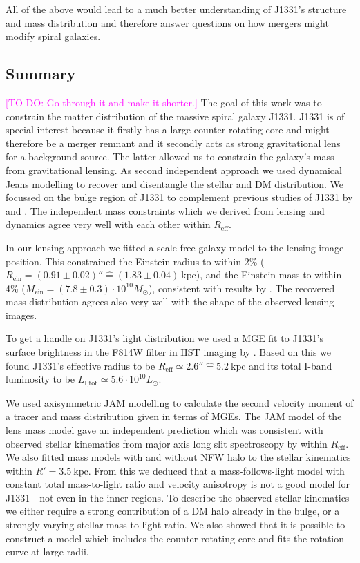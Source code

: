 \documentclass[useAMS,usenatbib]{mnras}
\newcommand{\Wilma}[1]{\textcolor{Magenta}{#1}}
\begin{document}
All of the above would lead to a much better understanding of J1331's structure and mass distribution and therefore answer questions on how mergers might modify spiral galaxies.

\subsection{Summary}
\Wilma{[TO DO: Go through it and make it shorter.]}
The goal of this work was to constrain the matter distribution of the massive spiral galaxy J1331. J1331 is of special interest because it firstly has a large counter-rotating core and might therefore be a merger remnant and it secondly acts as strong gravitational lens for a background source. The latter allowed us to constrain the galaxy's mass from gravitational lensing. As second independent approach we used dynamical Jeans modelling to recover and disentangle the stellar and DM distribution. We focussed on the bulge region of J1331 to complement previous studies of J1331 by \citet{SWELLSIII} and \citet{SWELLSV}. The independent mass constraints which we derived from lensing and dynamics agree very well with each other within $R_\text{eff}$.

In our lensing approach we fitted a scale-free galaxy model to the lensing image position. This constrained the Einstein radius to within 2\% ($R_\text{ein}=(0.91\pm0.02)'' \hat{=}(1.83\pm0.04)~\text{kpc}$), and the Einstein mass to within 4\% ($M_\text{ein} = (7.8\pm0.3) \cdot 10^{10} M_\odot$), consistent with results by \citet{SWELLSIII}. The recovered mass distribution agrees also very well with the shape of the observed lensing images.

To get a handle on J1331's light distribution we used a MGE fit to J1331's surface brightness in the F814W filter in HST imaging by \citet{SWELLSI}. Based on this we found J1331's effective radius to be $R_\text{eff} \simeq 2.6'' \hat{=} 5.2~\text{kpc}$ and its total I-band luminosity to be $L_\text{I,tot} \simeq 5.6 \cdot 10^{10} L_\odot$.

We used axisymmetric JAM modelling to calculate the second velocity moment of a tracer and mass distribution given in terms of MGEs. The JAM model of the lens mass model gave an independent prediction which was consistent with observed stellar kinematics from major axis long slit spectroscopy by \citet{SWELLSV} within $R_\text{eff}$. We also fitted mass models with and without NFW halo to the stellar kinematics within $R'=3.5~\text{kpc}$. From this we deduced that a mass-follows-light model with constant total mass-to-light ratio and velocity anisotropy is not a good model for J1331---not even in the inner regions. To describe the observed stellar kinematics we either require a strong contribution of a DM halo already in the bulge, or a strongly varying stellar mass-to-light ratio. We also showed that it is possible to construct a model which includes the counter-rotating core and fits the rotation curve at large radii.
\end{document}
